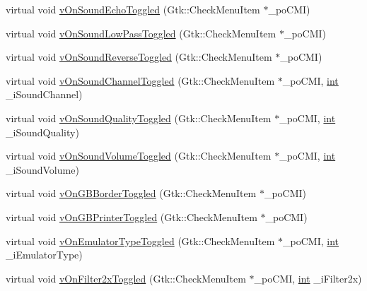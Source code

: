 \begin{DoxyCompactItemize}
\item 
virtual void \mbox{\hyperlink{class_v_b_a_1_1_window_acf58efc519acc8f3fd42b0e3481eff23}{v\+On\+Sound\+Echo\+Toggled}} (Gtk\+::\+Check\+Menu\+Item $\ast$\+\_\+po\+C\+MI)
\item 
virtual void \mbox{\hyperlink{class_v_b_a_1_1_window_a424a694cc0b0e3cb750ed07457b2b11e}{v\+On\+Sound\+Low\+Pass\+Toggled}} (Gtk\+::\+Check\+Menu\+Item $\ast$\+\_\+po\+C\+MI)
\item 
virtual void \mbox{\hyperlink{class_v_b_a_1_1_window_a1b7f801dd8f6c48c9161314e4ed266ed}{v\+On\+Sound\+Reverse\+Toggled}} (Gtk\+::\+Check\+Menu\+Item $\ast$\+\_\+po\+C\+MI)
\item 
virtual void \mbox{\hyperlink{class_v_b_a_1_1_window_aa64899ec70d7a82ab4eee24567585f3b}{v\+On\+Sound\+Channel\+Toggled}} (Gtk\+::\+Check\+Menu\+Item $\ast$\+\_\+po\+C\+MI, \mbox{\hyperlink{_util_8cpp_a0ef32aa8672df19503a49fab2d0c8071}{int}} \+\_\+i\+Sound\+Channel)
\item 
virtual void \mbox{\hyperlink{class_v_b_a_1_1_window_ae0ea496e382a463114dab0895698fed7}{v\+On\+Sound\+Quality\+Toggled}} (Gtk\+::\+Check\+Menu\+Item $\ast$\+\_\+po\+C\+MI, \mbox{\hyperlink{_util_8cpp_a0ef32aa8672df19503a49fab2d0c8071}{int}} \+\_\+i\+Sound\+Quality)
\item 
virtual void \mbox{\hyperlink{class_v_b_a_1_1_window_a6e1456ec5b5efc3a5e24d91ed918d503}{v\+On\+Sound\+Volume\+Toggled}} (Gtk\+::\+Check\+Menu\+Item $\ast$\+\_\+po\+C\+MI, \mbox{\hyperlink{_util_8cpp_a0ef32aa8672df19503a49fab2d0c8071}{int}} \+\_\+i\+Sound\+Volume)
\item 
virtual void \mbox{\hyperlink{class_v_b_a_1_1_window_aa7cf1b717713eb050de751b12ddfe72a}{v\+On\+G\+B\+Border\+Toggled}} (Gtk\+::\+Check\+Menu\+Item $\ast$\+\_\+po\+C\+MI)
\item 
virtual void \mbox{\hyperlink{class_v_b_a_1_1_window_a2d6e4c0bd7467305b02bd6f5b0343f26}{v\+On\+G\+B\+Printer\+Toggled}} (Gtk\+::\+Check\+Menu\+Item $\ast$\+\_\+po\+C\+MI)
\item 
virtual void \mbox{\hyperlink{class_v_b_a_1_1_window_a223cab540dae446895699f2ca1494f8e}{v\+On\+Emulator\+Type\+Toggled}} (Gtk\+::\+Check\+Menu\+Item $\ast$\+\_\+po\+C\+MI, \mbox{\hyperlink{_util_8cpp_a0ef32aa8672df19503a49fab2d0c8071}{int}} \+\_\+i\+Emulator\+Type)
\item 
virtual void \mbox{\hyperlink{class_v_b_a_1_1_window_ad73fe13a9e4c8b40fbe6f0726210cc5c}{v\+On\+Filter2x\+Toggled}} (Gtk\+::\+Check\+Menu\+Item $\ast$\+\_\+po\+C\+MI, \mbox{\hyperlink{_util_8cpp_a0ef32aa8672df19503a49fab2d0c8071}{int}} \+\_\+i\+Filter2x)

\end{DoxyCompactItemize}
